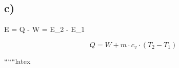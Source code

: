 

\subsection*{c)}

 \Delta E = Q - W = E_2 - E_1

\[
Q = W + m \cdot c_v \cdot (T_2 - T_1)
\]

``````latex